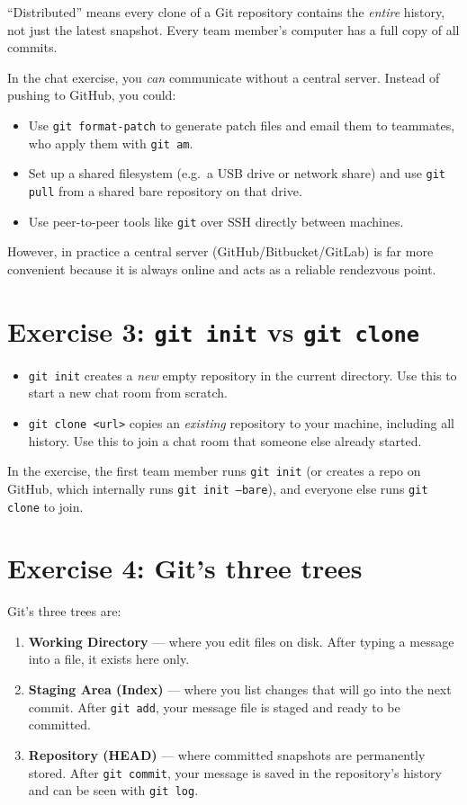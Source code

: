 \documentclass[twoside=false,DIV=14]{scrartcl}
\begin{document}
``Distributed'' means every clone of a Git repository contains the \emph{entire} history, not just the latest snapshot.  Every team member's computer has a full copy of all commits.

In the chat exercise, you \emph{can} communicate without a central server.  Instead of pushing to GitHub, you could:
\begin{itemize}
\item Use \texttt{git format-patch} to generate patch files and email them to teammates, who apply them with \texttt{git am}.
\item Set up a shared filesystem (e.g.\ a USB drive or network share) and use \texttt{git pull} from a shared bare repository on that drive.
\item Use peer-to-peer tools like \texttt{git} over SSH directly between machines.
\end{itemize}
However, in practice a central server (GitHub/Bitbucket/GitLab) is far more convenient because it is always online and acts as a reliable rendezvous point.

\section*{Exercise 3: \texttt{git init} vs \texttt{git clone}}

\begin{itemize}
    \item \texttt{git init} creates a \emph{new} empty repository in the current directory.  Use this to start a new chat room from scratch.
    \item \texttt{git clone <url>} copies an \emph{existing} repository to your machine, including all history.  Use this to join a chat room that someone else already started.
\end{itemize}
In the exercise, the first team member runs \texttt{git init} (or creates a repo on GitHub, which internally runs \texttt{git init --bare}), and everyone else runs \texttt{git clone} to join.

\section*{Exercise 4: Git's three trees}

Git's three trees are:

\begin{enumerate}
    \item \textbf{Working Directory} --- where you edit files on disk.  After typing a message into a file, it exists here only.
    \item \textbf{Staging Area (Index)} --- where you list changes that will go into the next commit.  After \texttt{git add}, your message file is staged and ready to be committed.
    \item \textbf{Repository (HEAD)} --- where committed snapshots are permanently stored.  After \texttt{git commit}, your message is saved in the repository's history and can be seen with \texttt{git log}.
\end{enumerate}
\end{document}
